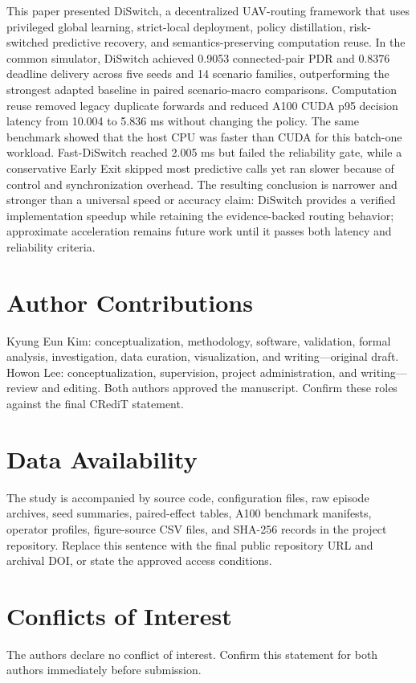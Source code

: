 \documentclass{ieeeaccess}
\newcommand{\DS}{DiSwitch}
\newcommand{\FastDS}{Fast-DiSwitch}
\newcommand{\MustEdit}[1]{\textcolor{ReviewRed}{#1}}
\newcommand{\VerifyEdit}[1]{\textcolor{ReviewBlue}{#1}}
\begin{document}
\VerifyEdit{This paper presented \DS{}, a decentralized UAV-routing framework that uses privileged global learning, strict-local deployment, policy distillation, risk-switched predictive recovery, and semantics-preserving computation reuse. In the common simulator, \DS{} achieved 0.9053 connected-pair PDR and 0.8376 deadline delivery across five seeds and 14 scenario families, outperforming the strongest adapted baseline in paired scenario-macro comparisons. Computation reuse removed legacy duplicate forwards and reduced A100 CUDA p95 decision latency from 10.004 to 5.836 ms without changing the policy. The same benchmark showed that the host CPU was faster than CUDA for this batch-one workload. \FastDS{} reached 2.005 ms but failed the reliability gate, while a conservative Early Exit skipped most predictive calls yet ran slower because of control and synchronization overhead.} The resulting conclusion is narrower and stronger than a universal speed or accuracy claim: \DS{} provides a verified implementation speedup while retaining the evidence-backed routing behavior; approximate acceleration remains future work until it passes both latency and reliability criteria.

\section*{Author Contributions}
\MustEdit{Kyung Eun Kim: conceptualization, methodology, software, validation, formal analysis, investigation, data curation, visualization, and writing---original draft. Howon Lee: conceptualization, supervision, project administration, and writing---review and editing. Both authors approved the manuscript. Confirm these roles against the final CRediT statement.}

\section*{Data Availability}
\MustEdit{The study is accompanied by source code, configuration files, raw episode archives, seed summaries, paired-effect tables, A100 benchmark manifests, operator profiles, figure-source CSV files, and SHA-256 records in the project repository. Replace this sentence with the final public repository URL and archival DOI, or state the approved access conditions.}

\section*{Conflicts of Interest}
\MustEdit{The authors declare no conflict of interest. Confirm this statement for both authors immediately before submission.}
\end{document}
